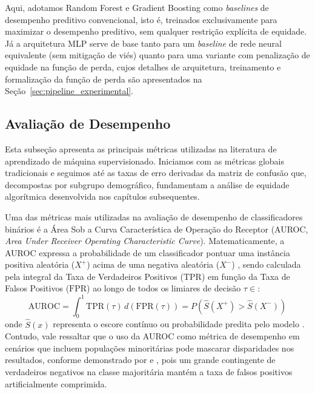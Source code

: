 Aqui, adotamos Random Forest e Gradient Boosting como \textit{baselines} de desempenho preditivo convencional, isto é, treinados exclusivamente para maximizar o desempenho preditivo, sem qualquer restrição explícita de equidade. Já a arquitetura MLP serve de base tanto para um \textit{baseline} de rede neural equivalente (sem mitigação de viés) quanto para uma variante com penalização de equidade na função de perda, cujos detalhes de arquitetura, treinamento e formalização da função de perda são apresentados na Seção~\ref{sec:pipeline_experimental}.

\subsection{Avaliação de Desempenho}

Esta subseção apresenta as principais métricas utilizadas na literatura de aprendizado de máquina supervisionado. Iniciamos com as métricas globais tradicionais e seguimos até as taxas de erro derivadas da matriz de confusão que, decompostas por subgrupo demográfico, fundamentam a análise de equidade algorítmica desenvolvida nos capítulos subsequentes.

Uma das métricas mais utilizadas na avaliação de desempenho de classificadores binários é a Área Sob a Curva Característica de Operação do Receptor (AUROC, \emph{Area Under Receiver Operating Characteristic Curve}). Matematicamente, a AUROC expressa a probabilidade de um classificador pontuar uma instância positiva aleatória ($X^+$) acima de uma negativa aleatória ($X^-$) \cite{hanley1982meaning}, sendo calculada pela integral da Taxa de Verdadeiros Positivos ($\text{TPR}$) em função da Taxa de Falsos Positivos ($\text{FPR}$) ao longo de todos os limiares de decisão $\tau \in $:
\begin{equation}
\text{AUROC} = \int_{0}^{1} \text{TPR}(\tau) \, d(\text{FPR}(\tau)) = P(\hat{S}(X^+) > \hat{S}(X^-))
\end{equation}
onde $\hat{S}(x)$ representa o escore contínuo ou probabilidade predita pelo modelo \cite{bradley1997use}. Contudo, vale ressaltar que o uso da AUROC como métrica de desempenho em cenários que incluem populações minoritárias pode mascarar disparidades nos resultados, conforme demonstrado por \citet{davis2006relationship} e \citet{saito2015precision}, pois um grande contingente de verdadeiros negativos na classe majoritária mantém a taxa de falsos positivos artificialmente comprimida.

